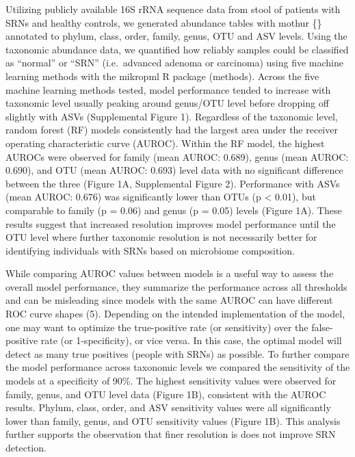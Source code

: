 \documentclass[]{article}
\begin{document}
Utilizing publicly available 16S rRNA sequence data from stool of
patients with SRNs and healthy controls, we generated abundance tables
with mothur \{\} annotated to phylum, class, order, family, genus, OTU
and ASV levels. Using the taxonomic abundance data, we quantified how
reliably samples could be classified as ``normal'' or ``SRN''
(i.e.~advanced adenoma or carcinoma) using five machine learning methods
with the mikropml R package (methods). Across the five machine learning
methods tested, model performance tended to increase with taxonomic
level usually peaking around genus/OTU level before dropping off
slightly with ASVs (Supplemental Figure 1). Regardless of the taxonomic
level, random forest (RF) models consistently had the largest area under
the receiver operating characteristic curve (AUROC). Within the RF
model, the highest AUROCs were observed for family (mean AUROC: 0.689),
genus (mean AUROC: 0.690), and OTU (mean AUROC: 0.693) level data with
no significant difference between the three (Figure 1A, Supplemental
Figure 2). Performance with ASVs (mean AUROC: 0.676) was significantly
lower than OTUs (p \textless{} 0.01), but comparable to family (p =
0.06) and genus (p = 0.05) levels (Figure 1A). These results suggest
that increased resolution improves model performance until the OTU level
where further taxonomic resolution is not necessarily better for
identifying individuals with SRNs based on microbiome composition.

While comparing AUROC values between models is a useful way to assess
the overall model performance, they summarize the performance across all
thresholds and can be misleading since models with the same AUROC can
have different ROC curve shapes (5). Depending on the intended
implementation of the model, one may want to optimize the true-positive
rate (or sensitivity) over the false-positive rate (or 1-specificity),
or vice versa. In this case, the optimal model will detect as many true
positives (people with SRNs) as possible. To further compare the model
performance across taxonomic levels we compared the sensitivity of the
models at a specificity of 90\%. The highest sensitivity values were
observed for family, genus, and OTU level data (Figure 1B), consistent
with the AUROC results. Phylum, class, order, and ASV sensitivity values
were all significantly lower than family, genus, and OTU sensitivity
values (Figure 1B). This analysis further supports the observation that
finer resolution is does not improve SRN detection.
\end{document}
